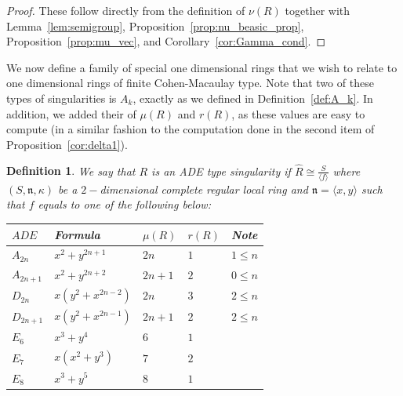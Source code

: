 \documentclass{article}
\newtheorem{definition}[theorem]{Definition}
\numberwithin{theorem}{section}
\begin{document}
\begin{proof}
    These follow directly from the definition of $\nu(R)$ together with Lemma~\ref{lem:semigroup}, Proposition~\ref{prop:nu_beasic_prop}, Proposition~\ref{prop:mu_vec}, and Corollary~\ref{cor:Gamma_cond}. 
\end{proof}

We now define a family of special one dimensional rings that we wish to relate to one dimensional rings of finite Cohen-Macaulay type. Note that two of these types of singularities is $A_k$, exactly as we defined in Definition~\ref{def:A_k}. In addition, we added their of $\mu(R)$ and $r(R)$, as these values are easy to compute (in a similar fashion to the computation done in the second item of Proposition~\ref{cor:delta1}). 

\begin{definition}\label{def:ADE_curves}
    We say that $R$ is an ADE type singularity if $\hat{R} \cong \frac{S}{\langle f \rangle}$ where $(S, \mathfrak{n}, \kappa)$ be a $2-$dimensional complete regular local ring and $\mathfrak{n} = \langle x,y \rangle$ such that $f$ equals to one of the following below:
\begin{center}
\hspace*{-0.8cm}
    \begin{tabular}{ | l | l | l | l | l |}
    \hline
    $ADE$  & Formula & $\mu(R)$ & $r(R)$ &  Note  \\ \hline \hline
    $A_{2n}$ & $x^2  + y^{2n+1}$ & $2n$ & $1$ & $1 \leq n$  \\ \hline
    $A_{2n+1}$ & $x^2  + y^{2n+2}$ & $2n+1$ & $2$ & $0 \leq n$  \\ \hline
    $D_{2n}$ & $x\left(y^2  + x^{2n-2}\right)$ & $2n$ & $3$ & $2 \leq n$  \\ \hline
    $D_{2n+1}$ & $x\left(y^2  + x^{2n-1}\right)$ & $2n+1$ & $2$ & $2 \leq n$  \\ \hline
    $E_6$ & $x^3 + y^{4}$ & $6$ & $1$ &    \\ \hline
    $E_7$ & $x\left(x^2 +  y^{3}\right)$ & $7$ & $2$ &  \\ \hline
    $E_8$ & $x^3 + y^{5}$ & $8$ & $1$ &   \\ \hline
    \end{tabular}

    \vspace{5mm}
\end{center}

\end{definition}
\end{document}
